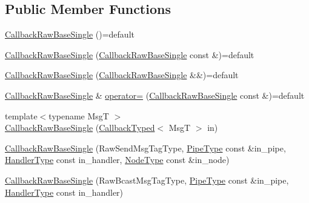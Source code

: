 \subsection*{Public Member Functions}
\begin{DoxyCompactItemize}
\item 
\hyperlink{structvt_1_1pipe_1_1callback_1_1cbunion_1_1_callback_raw_base_single_a54c1e88b04174314284479d39f31c46a}{Callback\+Raw\+Base\+Single} ()=default
\item 
\hyperlink{structvt_1_1pipe_1_1callback_1_1cbunion_1_1_callback_raw_base_single_a80569ca80e358052d839a15a0bcd287c}{Callback\+Raw\+Base\+Single} (\hyperlink{structvt_1_1pipe_1_1callback_1_1cbunion_1_1_callback_raw_base_single}{Callback\+Raw\+Base\+Single} const \&)=default
\item 
\hyperlink{structvt_1_1pipe_1_1callback_1_1cbunion_1_1_callback_raw_base_single_a8b2961b281dbf416f6d2eec2b7c11192}{Callback\+Raw\+Base\+Single} (\hyperlink{structvt_1_1pipe_1_1callback_1_1cbunion_1_1_callback_raw_base_single}{Callback\+Raw\+Base\+Single} \&\&)=default
\item 
\hyperlink{structvt_1_1pipe_1_1callback_1_1cbunion_1_1_callback_raw_base_single}{Callback\+Raw\+Base\+Single} \& \hyperlink{structvt_1_1pipe_1_1callback_1_1cbunion_1_1_callback_raw_base_single_a7037c612d471371061a32dc7b1bdea3a}{operator=} (\hyperlink{structvt_1_1pipe_1_1callback_1_1cbunion_1_1_callback_raw_base_single}{Callback\+Raw\+Base\+Single} const \&)=default
\item 
{\footnotesize template$<$typename MsgT $>$ }\\\hyperlink{structvt_1_1pipe_1_1callback_1_1cbunion_1_1_callback_raw_base_single_a00a840a889e6ca98c250d3f663972ade}{Callback\+Raw\+Base\+Single} (\hyperlink{structvt_1_1pipe_1_1callback_1_1cbunion_1_1_callback_typed}{Callback\+Typed}$<$ MsgT $>$ in)
\item 
\hyperlink{structvt_1_1pipe_1_1callback_1_1cbunion_1_1_callback_raw_base_single_a3d37003d95cb6fe474caa7f3053b9460}{Callback\+Raw\+Base\+Single} (Raw\+Send\+Msg\+Tag\+Type, \hyperlink{namespacevt_ac9852acda74d1896f48f406cd72c7bd3}{Pipe\+Type} const \&in\+\_\+pipe, \hyperlink{namespacevt_af64846b57dfcaf104da3ef6967917573}{Handler\+Type} const in\+\_\+handler, \hyperlink{namespacevt_a866da9d0efc19c0a1ce79e9e492f47e2}{Node\+Type} const \&in\+\_\+node)
\item 
\hyperlink{structvt_1_1pipe_1_1callback_1_1cbunion_1_1_callback_raw_base_single_aae697d509dacb338315d99b86602eeb7}{Callback\+Raw\+Base\+Single} (Raw\+Bcast\+Msg\+Tag\+Type, \hyperlink{namespacevt_ac9852acda74d1896f48f406cd72c7bd3}{Pipe\+Type} const \&in\+\_\+pipe, \hyperlink{namespacevt_af64846b57dfcaf104da3ef6967917573}{Handler\+Type} const in\+\_\+handler)

\end{DoxyCompactItemize}
